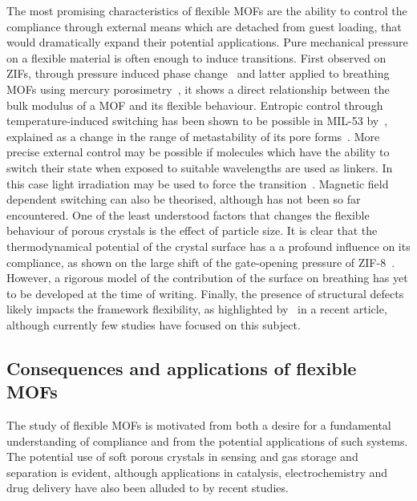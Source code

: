 The most promising characteristics of flexible \glspl{MOF} are the ability
to control the compliance through external means which are 
detached from guest loading, that would dramatically expand
their potential applications. 
Pure mechanical pressure on a flexible material 
is often enough to induce transitions. First observed on 
ZIFs, through pressure induced phase 
change~\cite{chapmanTrappingGuestsNanoporous2011, %
tanMechanicalPropertiesHybrid2011} and 
latter applied to breathing \glspl{MOF} using
mercury porosimetry~\cite{beurroiesUsingPressureProvoke2010, %
yotLargeBreathingMOF2012}, it 
shows a direct relationship between the bulk modulus of 
a \gls{MOF} and its flexible behaviour.
Entropic control through temperature-induced switching has been
shown to be possible in MIL-53 
by~\citet{liuReversibleStructuralTransition2008}, explained 
as a change in the range of metastability of its 
pore forms~\cite{boutinBehaviorFlexibleMIL532010}. 
More precise external control may be possible if molecules which
have the ability to switch their state when exposed to suitable
wavelengths are used as linkers. In this case light irradiation 
may be used to force the 
transition~\cite{lyndonDynamicPhotoSwitchingMetalOrganic2013}.
Magnetic field dependent switching can also be theorised, although
has not been so far encountered.
One of the least understood factors that changes the flexible
behaviour of porous crystals is the effect of particle size.
It is clear that the thermodynamical potential of the crystal surface
has a a profound influence on its compliance, as shown on 
the large shift of the gate-opening pressure of 
ZIF-8~\cite{zhangCrystalSizeDependentStructuralTransitions2014}.
However, a rigorous model of the contribution of the surface 
on breathing has yet to be developed at the time of writing.
Finally, the presence of structural defects likely impacts 
the framework flexibility, as highlighted 
by~\citet{bennettInterplayDefectsDisorder2016} in a 
recent article, although currently few studies have focused
on this subject.

\subsection{Consequences and applications of flexible MOFs}

The study of flexible \glspl{MOF} is motivated from both a desire 
for a fundamental understanding of compliance and from the potential
applications of such systems. The potential use of soft porous crystals
in sensing and gas storage and separation is evident, although 
applications in catalysis, electrochemistry and drug delivery 
have also been alluded to by recent studies.

